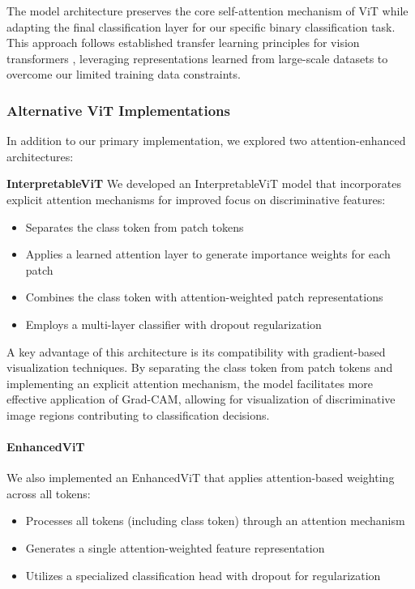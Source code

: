 \documentclass[a4paper,12pt]{report}
\begin{document}
The model architecture preserves the core self-attention mechanism of ViT while adapting the final classification layer for our specific binary classification task. This approach follows established transfer learning principles for vision transformers \citep{touvron2021trainingdataefficientimagetransformers}, leveraging representations learned from large-scale datasets to overcome our limited training data constraints.

\subsubsection{Alternative ViT Implementations}

In addition to our primary implementation, we explored two attention-enhanced architectures:

\textbf{InterpretableViT}
We developed an InterpretableViT model that incorporates explicit attention mechanisms for improved focus on discriminative features:

\begin{itemize}
    \item Separates the class token from patch tokens
    \item Applies a learned attention layer to generate importance weights for each patch
    \item Combines the class token with attention-weighted patch representations
    \item Employs a multi-layer classifier with dropout regularization
\end{itemize}

A key advantage of this architecture is its compatibility with gradient-based visualization techniques. By separating the class token from patch tokens and implementing an explicit attention mechanism, the model facilitates more effective application of Grad-CAM, allowing for visualization of discriminative image regions contributing to classification decisions.


\paragraph{EnhancedViT}
We also implemented an EnhancedViT that applies attention-based weighting across all tokens:

\begin{itemize}
    \item Processes all tokens (including class token) through an attention mechanism
    \item Generates a single attention-weighted feature representation
    \item Utilizes a specialized classification head with dropout for regularization
\end{itemize}
\end{document}
